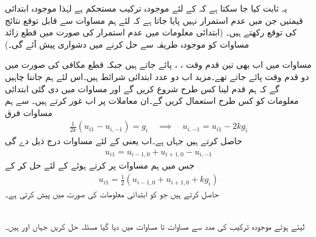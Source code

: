 یہ ثابت کیا جا سکتا ہے کہ  کے لئے موجودہ ترکیب مستحکم ہے لہٰذا موجودہ ابتدائی قیمتیں جن میں عدم استمرار نہیں پایا جاتا ہے کہ لئے ہم مساوات  سے  قابل توقع نتائج کی توقع رکھتے ہیں۔ (ابتدائی معلومات میں عدم استمرار کی صورت میں قطع زائد مساوات کو موجودہ طریقہ سے حل کرنے میں دشواری پیش آئے گی۔)

مساوات  میں اب بھی تین قدم وقت ، ،  پائے جاتے ہیں جبکہ قطع مکافی کی صورت میں دو قدم وقت پائے جاتے تھے۔مزید اب دو عدد ابتدائی شرائط ہیں۔اس لئے ہم جاننا چاہیں گے کہ ہم قدم لینا کس طرح شروع کریں گے  اور مساوات  میں دی گئی ابتدائی معلومات کو کس طرح استعمال کریں گے۔ان معاملات پر اب غور کرتے ہیں۔ سے ہم مساوات فرق
\begin{align}\label{مساوات_اعدادی_موج_ج}
\frac{1}{2k}(u_{i1}-u_{i,-1})=g_i \quad \implies \quad u_{i,-1}=u_{i1}-2kg_i
\end{align}
حاصل کرتے ہیں جہاں  ہے۔اب  یعنی  کے لئے مساوات  درج ذیل دے گی
\begin{align*}
u_{i1}=u_{i-1,0}+u_{i+1,0}-u_{i,-1}
\end{align*}
جس میں ہم مساوات  پر کرتے ہوئے  کے لئے حل کر کے
\begin{align}\label{مساوات_اعدادی_موج_چ}
u_{i1}=\frac{1}{2}(u_{i-1,0}+u_{i+1,0}+kg_i)
\end{align}
حاصل کرتے ہیں جو  کو ابتدائی معلومات کی صورت میں پیش کرتی ہے۔

\quad {}\\
 لیتے ہوئے موجودہ ترکیب کی  مدد سے مساوات  تا مساوات  میں دیا گیا مسئلہ حل کریں جہاں  اور  ہیں۔ 

